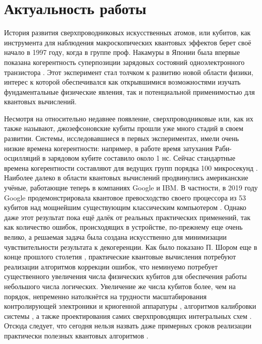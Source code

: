 \documentclass[14pt, a4paper]{extreport}
\numberwithin{equation}{section}
\begin{document}
\section*{Актуальность работы}

История развития сверхпроводниковых искусственных атомов, или кубитов, как инструмента для наблюдения макроскопических квантовых эффектов берет своё начало в 1997 году, когда в группе проф. Накамуры в Японии была впервые показана когерентность суперпозиции зарядовых состояний одноэлектронного транзистора \cite{nakamura1997spectroscopy}. Этот эксперимент стал толчком к развитию новой области физики, интерес к которой обеспечивался как открывшимися возможностями изучать фундаментальные физические явления, так и потенциальной применимостью для квантовых вычислений.

Несмотря на относительно недавнее появление, сверхпроводниковые или, как их также называют, джозефсоновские кубиты прошли уже много стадий в своем развитии. Системы, исследовавшиеся в первых экспериментах, имели очень низкие времена когерентности: например, в работе \cite{nakamura1999coherent} время затухания Раби-осцилляций в зарядовом кубите составило около 1 нс. Сейчас стандартные времена когерентности составляют для ведущих групп порядка 100 микросекунд \cite{kjaergaard2020superconducting}. Наиболее далеко в области квантовых вычислений продвинулись американские учёные, работающие теперь в компаниях Google и IBM. В частности, в 2019 году Google продемонстрировала квантовое превосходство своего процессора из 53 кубитов над мощнейшим существующим классическим компьютером \cite{arute2019quantum}. Однако даже этот результат пока ещё далёк от реальных практических применений, так как количество ошибок, происходящих в устройстве, по-прежнему еще очень велико, а решаемая задача была создана искусственно для минимизации чувствительности результата к декогеренции. Как было показано П. Шором еще в конце прошлого столетия \cite{shor1995scheme}, практические квантовые вычисления потребуют реализации алгоритмов коррекции ошибок, что неминуемо потребует существенного увеличения числа физических кубитов для обеспечения работы небольшого числа логических. Увеличение же числа кубитов более, чем на порядок, непременно натолкнётся на трудности масштабирования контролирующей электроники и криогенной аппаратуры \cite{krinner2019engineering}, алгоритмов калибровки системы \cite{arute2019quantum, kelly2018physical}, а также проектирования самих сверхпроводящих интегральных схем \cite{hutchings2017tunable}. Отсюда следует, что сегодня нельзя назвать даже примерных сроков реализации практически полезных квантовых алгоритмов \cite{arute2019quantum}.
\end{document}
